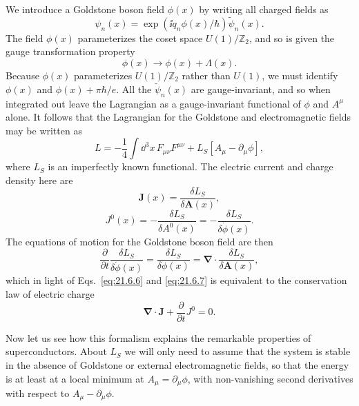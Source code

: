 We introduce a Goldstone boson field $\phi(x)$ by writing all charged fields as
\begin{equation}
\psi_n(x)=\exp\!\left(\ii q_n\phi(x)/\hbar\right)\widetilde\psi_n(x).
\tag{21.6.3}\label{eq:21.6.3}
\end{equation}
The field $\phi(x)$ parameterizes the coset space $U(1)/\mathbb Z_2$, and so is given the gauge transformation property
\begin{equation}
\phi(x)\longrightarrow\phi(x)+\Lambda(x).
\tag{21.6.4}\label{eq:21.6.4}
\end{equation}
Because $\phi(x)$ parameterizes $U(1)/\mathbb Z_2$ rather than $U(1)$, we must identify $\phi(x)$ and $\phi(x)+\pi\hbar/e$. All the $\widetilde\psi_n(x)$ are gauge-invariant, and so when integrated out leave the Lagrangian as a gauge-invariant functional of $\phi$ and $A^\mu$ alone. It follows that the Lagrangian for the Goldstone and electromagnetic fields may be written as
\begin{equation}
L=-\frac14\int \dd^3x\,F_{\mu\nu}F^{\mu\nu}
+L_S[A_\mu-\partial_\mu\phi],
\tag{21.6.5}\label{eq:21.6.5}
\end{equation}
where $L_S$ is an imperfectly known functional. The electric current and charge density here are
\begin{equation}
\mathbf J(x)=\frac{\delta L_S}{\delta\mathbf A(x)},
\tag{21.6.6}\label{eq:21.6.6}
\end{equation}
\begin{equation}
J^0(x)=-\frac{\delta L_S}{\delta A^0(x)}
=-\frac{\delta L_S}{\delta\dot\phi(x)}.
\tag{21.6.7}\label{eq:21.6.7}
\end{equation}
The equations of motion for the Goldstone boson field are then
\begin{equation}
\frac{\partial}{\partial t}
\frac{\delta L_S}{\delta\dot\phi(x)}
=\frac{\delta L_S}{\delta\phi(x)}
=\boldsymbol\nabla\cdot
\frac{\delta L_S}{\delta\mathbf A(x)},
\tag{21.6.8}\label{eq:21.6.8}
\end{equation}
which in light of Eqs.~\eqref{eq:21.6.6} and \eqref{eq:21.6.7} is equivalent to the conservation law of electric charge
\begin{equation}
\boldsymbol\nabla\cdot\mathbf J
+\frac{\partial}{\partial t}J^0=0.
\tag{21.6.9}\label{eq:21.6.9}
\end{equation}

Now let us see how this formalism explains the remarkable properties of superconductors. About $L_S$ we will only need to assume that the system is stable in the absence of Goldstone or external electromagnetic fields, so that the energy is at least at a local minimum at $A_\mu=\partial_\mu\phi$, with non-vanishing second derivatives with respect to $A_\mu-\partial_\mu\phi$.


